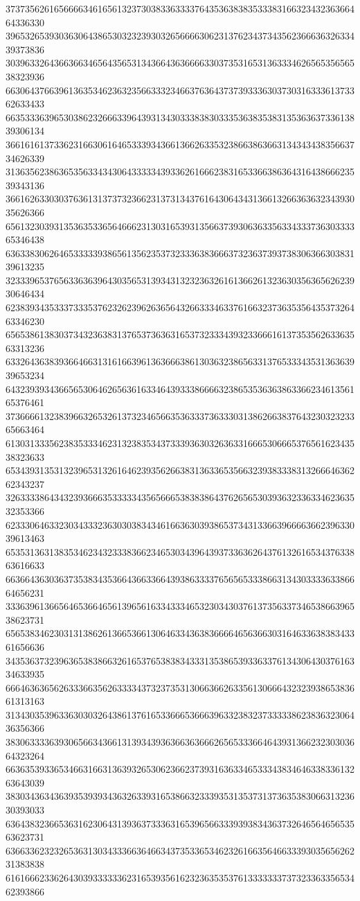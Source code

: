 37373562616566663461656132373038336333376435363838353338316632343236366464336330
39653265393036306438653032323930326566663062313762343734356236663632633439373836
30396332643663663465643565313436643636666330373531653136333462656535656538323936
66306437663961363534623632356633323466376364373739333630373031633361373362633433
66353336396530386232666339643931343033383830333536383538313536363733613839306134
36616161373362316630616465333934366136626335323866386366313434343835663734626339
31363562386365356334343064333334393362616662383165336638636431643866623539343136
36616263303037636131373732366231373134376164306434313661326636363234393035626366
65613230393135363533656466623130316539313566373930636335633433373630333365346438
63633830626465333339386561356235373233363836663732363739373830636630383139613235
32333965376563363639643035653139343132323632616136626132363035636562623930646434
62383934353337333537623262396263656432663334633761663237363535643537326463346230
65653861383037343236383137653736363165373233343932336661613735356263363563313236
63326436383936646631316166396136366638613036323865633137653334353136363939653234
64323939343665653064626563616334643933386666323865353636386336623461356165376461
37366661323839663265326137323465663536333736333031386266383764323032323365663464
61303133356238353334623132383534373339363032636331666530666537656162343538323633
65343931353132396531326164623935626638313633653566323938333831326664636262343237
32633338643432393666353333343565666538383864376265653039363233633462363532353366
62333064633230343332363030383434616636303938653734313366396666366239633039613463
65353136313835346234323338366234653034396439373363626437613261653437633863616633
66366436303637353834353664366336643938633337656565333866313430333363386664656231
33363961366564653664656139656163343334653230343037613735633734653866396538623731
65653834623031313862613665366130646334363836666465636630316463363838343361656636
34353637323963653838663261653765383834333135386539336337613430643037616334633935
66646363656263336635626333343732373531306636626335613066643232393865383661313163
31343035396336303032643861376165336665366639633238323733333862383632306436356366
38306333363930656634366131393439363663636662656533366464393136623230303664323264
66363539336534663166313639326530623662373931636334653334383464633833613263643039
38303436343639353939343632633931653866323339353135373137363538306631323630393033
63643832366536316230643139363733363165396566333939383436373264656465653563623731
63663362323265363130343336636466343735336534623261663564663339303565626231383838
61616662336264303933333362316539356162323635353761333333373732336335653462393866
